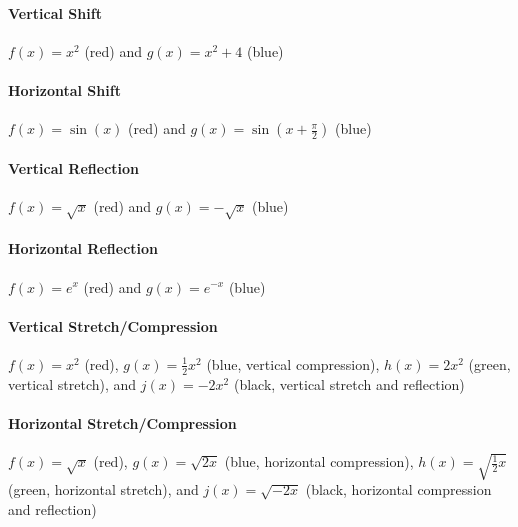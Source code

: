 \paragraph{Vertical Shift}

$f(x) = x^2$ (red) and $g(x) = x^2 + 4$ (blue)


\paragraph{Horizontal Shift}

$f(x) = \sin(x)$ (red) and $g(x) = \sin(x + \frac{\pi}{2})$ (blue)


\paragraph{Vertical Reflection}

$f(x) = \sqrt{x}$ (red) and $g(x) = -\sqrt{x}$ (blue)


\paragraph{Horizontal Reflection}

$f(x) = e^x$ (red) and $g(x) = e^{-x}$ (blue)


\paragraph{Vertical Stretch/Compression}

$f(x) = x^2$ (red), $g(x) = \frac{1}{2}x^2$ (blue, vertical compression), $h(x) = 2x^2$ (green, vertical stretch), and $j(x) = -2x^2$ (black, vertical stretch and reflection)


\paragraph{Horizontal Stretch/Compression}

$f(x) = \sqrt{x}$ (red), $g(x) = \sqrt{2x}$ (blue, horizontal compression), $h(x) = \sqrt{\frac{1}{2}x}$ (green, horizontal stretch), and $j(x) = \sqrt{-2x}$ (black, horizontal compression and reflection)


